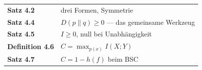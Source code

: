 \begin{merksatz}
\begin{center}
\renewcommand{\arraystretch}{1.5}
\begin{tabular}{@{}P{3.0cm}P{5.6cm}@{}}
\toprule
\textbf{Satz 4.2} & drei Formen, Symmetrie\\
\textbf{Satz 4.4} & $D(p\|q)\ge0$ --- das gemeinsame Werkzeug\\
\textbf{Satz 4.5} & $I \ge 0$, null bei Unabhängigkeit\\
\textbf{Definition 4.6} & $C = \max_{p(x)} I(X;Y)$\\
\textbf{Satz 4.7} & $C = 1-h(f)$ beim BSC\\
\bottomrule
\end{tabular}
\end{center}

\begin{center}
\begin{minipage}{0.88\textwidth}
\end{minipage}
\end{center}
\end{merksatz}
